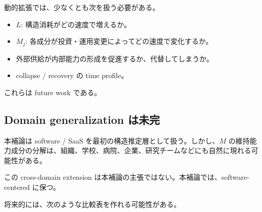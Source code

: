 \documentclass[12pt,a4paper]{article}
\begin{document}
動的拡張では、少なくとも次を扱う必要がある。

\begin{itemize}
\tightlist
\item
  \(\dot L\): 構造消耗がどの速度で増えるか。
\item
  \(\dot M_j\): 各成分が投資・運用変更によってどの速度で変化するか。
\item
  外部供給が内部能力の形成を促進するか、代替してしまうか。
\item
  collapse / recovery の time profile。
\end{itemize}

これらは future work である。

\subsection{Domain generalization は未完}\label{domain-generalization-ux306fux672aux5b8c}

本補論は software / SaaS を最初の構造推定層として扱う。しかし、\(M\) の維持能力成分の分解は、組織、学校、病院、企業、研究チームなどにも自然に現れる可能性がある。

この cross-domain extension は本補論の主張ではない。本補論では、software-centered に保つ。

将来的には、次のような比較表を作れる可能性がある。
\end{document}
